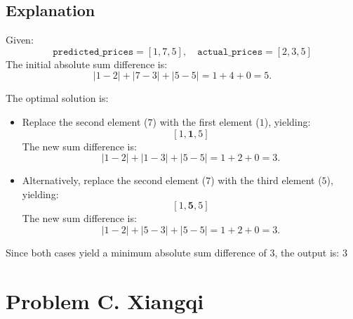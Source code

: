 \documentclass[12pt,a4paper]{article}
\begin{document}
\subsection*{\fontsize{16}{12}Explanation}
Given:
\[
\texttt{predicted\_prices} = [1, 7, 5], \quad \texttt{actual\_prices} = [2, 3, 5]
\]
The initial absolute sum difference is:
\[
\left| 1 - 2 \right| + \left| 7 - 3 \right| + \left| 5 - 5 \right| = 1 + 4 + 0 = 5.
\]

\noindent The optimal solution is:
\begin{itemize}
    \item Replace the second element ($7$) with the first element ($1$), yielding:
    \[
    [1, \mathbf{1}, 5]
    \]
    The new sum difference is:
    \[
    \left| 1 - 2 \right| + \left| 1 - 3 \right| + \left| 5 - 5 \right| = 1 + 2 + 0 = 3.
    \]
    
    \item Alternatively, replace the second element ($7$) with the third element ($5$), yielding:
    \[
    [1, \mathbf{5}, 5]
    \]
    The new sum difference is:
    \[
    \left| 1 - 2 \right| + \left| 5 - 3 \right| + \left| 5 - 5 \right| = 1 + 2 + 0 = 3.
    \]
\end{itemize}

\noindent Since both cases yield a minimum absolute sum difference of \( 3 \), the output is: $3$
\newpage

\section*{\fontsize{18}{12}Problem C. Xiangqi }
\end{document}

